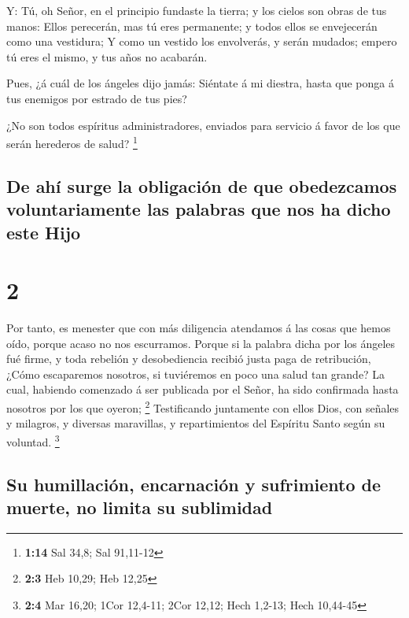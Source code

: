  Y: Tú, oh Señor, en el principio fundaste la tierra; y los
cielos son obras de tus manos:  Ellos perecerán, mas tú
eres permanente; y todos ellos se envejecerán como una vestidura;
 Y como un vestido los envolverás, y serán mudados; empero
tú eres el mismo, y tus años no acabarán.

 Pues, ¿á cuál de los ángeles dijo jamás: Siéntate á mi
diestra, hasta que ponga á tus enemigos por estrado de tus pies?

 ¿No son todos espíritus administradores, enviados para
servicio á favor de los que serán herederos de salud? \footnote{\textbf{1:14}
  Sal 34,8; Sal 91,11-12}

\hypertarget{de-ahuxed-surge-la-obligaciuxf3n-de-que-obedezcamos-voluntariamente-las-palabras-que-nos-ha-dicho-este-hijo}{%
\subsection{De ahí surge la obligación de que obedezcamos
voluntariamente las palabras que nos ha dicho este
Hijo}\label{de-ahuxed-surge-la-obligaciuxf3n-de-que-obedezcamos-voluntariamente-las-palabras-que-nos-ha-dicho-este-hijo}}

\hypertarget{section-1}{%
\section{2}\label{section-1}}

 Por tanto, es menester que con más diligencia atendamos á
las cosas que hemos oído, porque acaso no nos escurramos. 
Porque si la palabra dicha por los ángeles fué firme, y toda rebelión y
desobediencia recibió justa paga de retribución,  ¿Cómo
escaparemos nosotros, si tuviéremos en poco una salud tan grande? La
cual, habiendo comenzado á ser publicada por el Señor, ha sido
confirmada hasta nosotros por los que oyeron; \footnote{\textbf{2:3} Heb
  10,29; Heb 12,25}  Testificando juntamente con ellos Dios,
con señales y milagros, y diversas maravillas, y repartimientos del
Espíritu Santo según su voluntad. \footnote{\textbf{2:4} Mar 16,20; 1Cor
  12,4-11; 2Cor 12,12; Hech 1,2-13; Hech 10,44-45}

\hypertarget{su-humillaciuxf3n-encarnaciuxf3n-y-sufrimiento-de-muerte-no-limita-su-sublimidad}{%
\subsection{Su humillación, encarnación y sufrimiento de muerte, no
limita su
sublimidad}\label{su-humillaciuxf3n-encarnaciuxf3n-y-sufrimiento-de-muerte-no-limita-su-sublimidad}}

